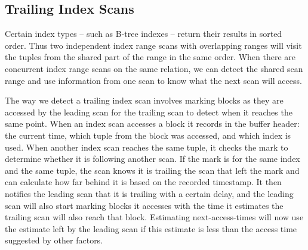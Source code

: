 


\subsection{Trailing Index Scans\label{sec:idx_trailing}}


Certain index types -- such as B-tree indexes -- return their results in sorted order. Thus two independent index range scans with overlapping ranges will visit the tuples from the shared part of the range in the same order. When there are concurrent index range scans on the same relation, we can detect the shared scan range and use information from one scan to know what the next scan will access.

The way we detect a trailing index scan involves marking blocks as they are accessed by the leading scan for the trailing scan to detect when it reaches the same point. When an index scan accesses a block it records in the buffer header: the current time, which tuple from the block was accessed, and which index is used. When another index scan reaches the same tuple, it checks the mark to determine whether it is following another scan. If the mark is for the same index and the same tuple, the scan knows it is trailing the scan that left the mark and can calculate how far behind it is based on the recorded timestamp. It then notifies the leading scan that it is trailing with a certain delay, and the leading scan will also start marking blocks it accesses with the time it estimates the trailing scan will also reach that block. Estimating next-access-times will now use the estimate left by the leading scan if this estimate is less than the access time suggested by other factors.

